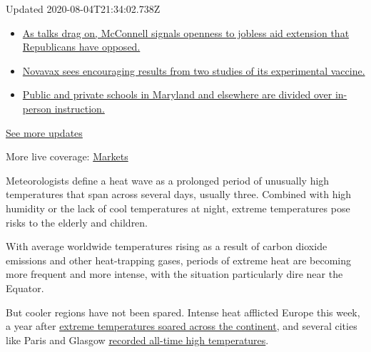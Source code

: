 Updated 2020-08-04T21:34:02.738Z

\begin{itemize}
\tightlist
\item
  \href{https://www.nytimes3xbfgragh.onion/2020/08/04/world/coronavirus-cases.html?action=click\&pgtype=Article\&state=default\&region=MAIN_CONTENT_1\&context=storylines_live_updates\#link-2daa96b5}{As
  talks drag on, McConnell signals openness to jobless aid extension
  that Republicans have opposed.}
\item
  \href{https://www.nytimes3xbfgragh.onion/2020/08/04/world/coronavirus-cases.html?action=click\&pgtype=Article\&state=default\&region=MAIN_CONTENT_1\&context=storylines_live_updates\#link-1228a480}{Novavax
  sees encouraging results from two studies of its experimental
  vaccine.}
\item
  \href{https://www.nytimes3xbfgragh.onion/2020/08/04/world/coronavirus-cases.html?action=click\&pgtype=Article\&state=default\&region=MAIN_CONTENT_1\&context=storylines_live_updates\#link-4825b93}{Public
  and private schools in Maryland and elsewhere are divided over
  in-person instruction.}
\end{itemize}

\href{https://www.nytimes3xbfgragh.onion/2020/08/04/world/coronavirus-cases.html?action=click\&pgtype=Article\&state=default\&region=MAIN_CONTENT_1\&context=storylines_live_updates}{See
more updates}

More live coverage:
\href{https://www.nytimes3xbfgragh.onion/live/2020/08/04/business/stock-market-today-coronavirus?action=click\&pgtype=Article\&state=default\&region=MAIN_CONTENT_1\&context=storylines_live_updates}{Markets}

Meteorologists define a heat wave as a prolonged period of unusually
high temperatures that span across several days, usually three. Combined
with high humidity or the lack of cool temperatures at night, extreme
temperatures pose risks to the elderly and children.

With average worldwide temperatures rising as a result of carbon dioxide
emissions and other heat-trapping gases, periods of extreme heat are
becoming more frequent and more intense, with the situation particularly
dire near the Equator.

But cooler regions have not been spared. Intense heat afflicted Europe
this week, a year after
\href{https://www.nytimes3xbfgragh.onion/2019/06/26/world/europe/europe-heat-wave.html}{extreme
temperatures soared across the continent}, and several cities like Paris
and Glasgow
\href{https://www.nytimes3xbfgragh.onion/2019/07/25/world/europe/heatwave-record-temperatures.html}{recorded
all-time high temperatures}.


